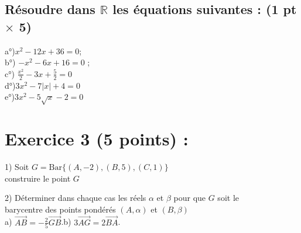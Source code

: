 \documentclass[12pt]{article}
\begin{document}
\subsection*{ Résoudre dans $\mathbb{R}$ les équations suivantes : (1 pt $\times$ 5)}
a°)$x^{2}-12x+36=0$;\\ 
b°) $-x^{2}-6x+16=0$ ;\\
c°) $\frac{x^{2}}{2}-3x+\frac{5}{2}=0$\\
d°)$3x^{2}-7|x|+4 = 0$\\
e°)$3x^{2}-5\sqrt{x}-2 = 0$
\section*{Exercice 3 (5 points) :}
1) Soit $G=\mathrm{Bar}\lbrace (A,-2),(B,5),(C,1)\rbrace$\\
construire le point $G$

2) Déterminer dans chaque cas les réels $\alpha$ et $\beta$ pour que $G$ soit le \\barycentre des points pondérés $(A,\alpha)$ et $(B,\beta)$\\
a) $\overrightarrow{AB}=-\frac{2}{5}\overrightarrow{GB}$.\quad\quad b) $3\overrightarrow{AG}=2\overrightarrow{BA}$.\\
\end{document}
